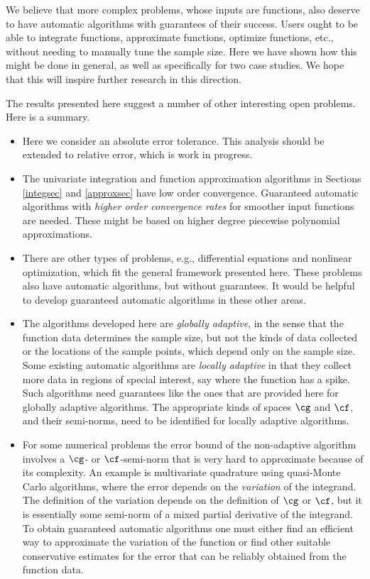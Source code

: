 \documentclass[]{elsarticle}
\theoremstyle{definition}
\theoremstyle{remark}
\begin{document}
We believe that more complex problems, whose inputs are functions, also deserve to have automatic algorithms with guarantees of their success.  Users ought to be able to integrate functions, approximate functions, optimize functions, etc., without needing to manually tune the sample size.  Here we have shown how this might be done in general, as well as specifically for two case studies.  We hope that this will inspire further research in this direction.



The results presented here suggest a number of other interesting open problems.  Here is a summary.

\begin{itemize}

\item Here we consider an absolute error tolerance.  This analysis should be extended to relative error, which is work in progress.  

\item The univariate integration and function approximation algorithms in Sections \ref{integsec} and \ref{approxsec} have low order convergence.  Guaranteed automatic algorithms with \emph{higher order convergence rates} for smoother input functions are needed.  These might be based on higher degree piecewise polynomial approximations.

\item There are other types of problems, e.g., differential equations and nonlinear optimization, which fit the general framework presented here.  These problems also have automatic algorithms, but without guarantees.  It would be helpful to develop guaranteed automatic algorithms in these other areas.

\item The algorithms developed here are \emph{globally adaptive}, in the sense that the function data determines the sample size, but not the kinds of data collected or the locations of the sample points, which depend only on the sample size.  Some existing automatic algorithms are \emph{locally adaptive} in that they collect more data in regions of special interest, say where the function has a spike.  Such algorithms need guarantees like the ones that are provided here for globally adaptive algorithms.  The appropriate kinds of spaces $\cg$ and $\cf$, and their semi-norms, need to be identified for locally adaptive algorithms.

\item For some numerical problems the error bound of the non-adaptive algorithm involves a $\cg$- or $\cf$-semi-norm that is very hard to approximate because of its complexity.  An example is multivariate quadrature using quasi-Monte Carlo algorithms, where the error depends on the \emph{variation} of the integrand.  The definition of the variation depends on the definition of $\cg$ or $\cf$, but it is essentially some semi-norm of a mixed partial derivative of the integrand.  To obtain guaranteed automatic algorithms one must either find an efficient way to approximate the variation of the function or find other suitable conservative estimates for the error that can be reliably obtained from the function data.  


\end{itemize}
\end{document}
